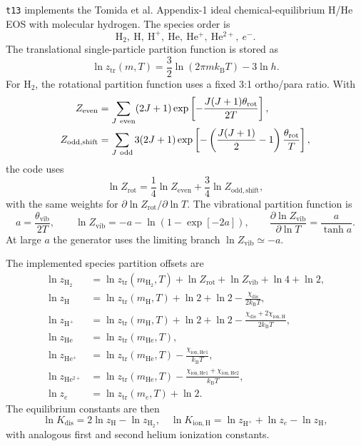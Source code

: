 \documentclass[11pt]{article}
\newcommand{\kb}{k_{\mathrm B}}
\newcommand{\me}{m_e}
\newcommand{\mh}{m_{\mathrm H}}
\newcommand{\mhe}{m_{\mathrm{He}}}
\begin{document}
\texttt{t13} implements the Tomida et al. Appendix-1 ideal
chemical-equilibrium H/He EOS with molecular hydrogen.  The species order is
\begin{equation}
  \mathrm{H_2},\ \mathrm H,\ \mathrm{H^+},\
  \mathrm{He},\ \mathrm{He^+},\ \mathrm{He^{2+}},\ e^-.
\end{equation}
The translational single-particle partition function is stored as
\begin{equation}
  \ln z_{\mathrm{tr}}(m,T) =
  \frac{3}{2}\ln(2\pi m\kb T)-3\ln h.
\end{equation}
For H$_2$, the rotational partition function uses a fixed 3:1 ortho/para
ratio.  With
\begin{align}
  Z_{\mathrm{even}} &=
    \sum_{J\ {\rm even}}(2J+1)
    \exp\left[-\frac{J(J+1)\theta_{\mathrm{rot}}}{2T}\right],
\\
  Z_{\mathrm{odd,shift}} &=
    \sum_{J\ {\rm odd}}3(2J+1)
    \exp\left[-\left(\frac{J(J+1)}{2}-1\right)
    \frac{\theta_{\mathrm{rot}}}{T}\right],
\end{align}
the code uses
\begin{equation}
  \ln Z_{\mathrm{rot}} =
  \frac{1}{4}\ln Z_{\mathrm{even}}
  +\frac{3}{4}\ln Z_{\mathrm{odd,shift}},
\end{equation}
with the same weights for $\partial\ln Z_{\mathrm{rot}}/\partial\ln T$.
The vibrational partition function is
\begin{equation}
  a=\frac{\theta_{\mathrm{vib}}}{2T}, \qquad
  \ln Z_{\mathrm{vib}} =
  -a-\ln\left(1-\exp[-2a]\right),
  \qquad
  \frac{\partial\ln Z_{\mathrm{vib}}}{\partial\ln T} =
  \frac{a}{\tanh a}.
\end{equation}
At large $a$ the generator uses the limiting branch
$\ln Z_{\mathrm{vib}}\simeq -a$.

The implemented species partition offsets are
\begin{align}
  \ln z_{\mathrm{H_2}} &=
    \ln z_{\mathrm{tr}}(m_{\mathrm{H_2}},T)
    +\ln Z_{\mathrm{rot}}+\ln Z_{\mathrm{vib}}+\ln4+\ln2,
\\
  \ln z_{\mathrm H} &=
    \ln z_{\mathrm{tr}}(\mh,T)+\ln2+\ln2
    -\frac{\chi_{\mathrm{dis}}}{2\kb T},
\\
  \ln z_{\mathrm{H^+}} &=
    \ln z_{\mathrm{tr}}(\mh,T)+\ln2+\ln2
    -\frac{\chi_{\mathrm{dis}}+2\chi_{\mathrm{ion,H}}}{2\kb T},
\\
  \ln z_{\mathrm{He}} &= \ln z_{\mathrm{tr}}(\mhe,T),
\\
  \ln z_{\mathrm{He^+}} &=
    \ln z_{\mathrm{tr}}(\mhe,T)-\frac{\chi_{\mathrm{ion,He1}}}{\kb T},
\\
  \ln z_{\mathrm{He^{2+}}} &=
    \ln z_{\mathrm{tr}}(\mhe,T)
    -\frac{\chi_{\mathrm{ion,He1}}+\chi_{\mathrm{ion,He2}}}{\kb T},
\\
  \ln z_e &= \ln z_{\mathrm{tr}}(\me,T)+\ln2.
\end{align}
The equilibrium constants are then
\begin{equation}
  \ln K_{\mathrm{dis}}=2\ln z_{\mathrm H}-\ln z_{\mathrm{H_2}},
  \quad
  \ln K_{\mathrm{ion,H}}=\ln z_{\mathrm{H^+}}+\ln z_e-\ln z_{\mathrm H},
\end{equation}
with analogous first and second helium ionization constants.
\end{document}
